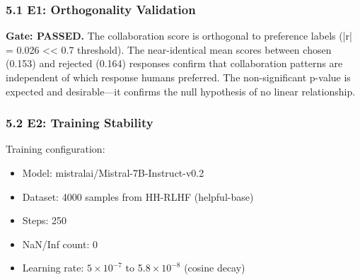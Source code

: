
\subsubsection{5.1 E1: Orthogonality Validation}

\begin{table}[htbp]
\centering
{}
\end{table}

\textbf{Gate: PASSED.} The collaboration score is orthogonal to preference labels (|r| = 0.026 << 0.7 threshold). The near-identical mean scores between chosen (0.153) and rejected (0.164) responses confirm that collaboration patterns are independent of which response humans preferred. The non-significant p-value is expected and desirable---it confirms the null hypothesis of no linear relationship.

\subsubsection{5.2 E2: Training Stability}

\begin{table}[htbp]
\centering
{}
\end{table}

Training configuration:
\begin{itemize}
\item Model: mistralai/Mistral-7B-Instruct-v0.2
\item Dataset: 4000 samples from HH-RLHF (helpful-base)
\item Steps: 250
\item NaN/Inf count: 0
\item Learning rate: $5\times 10^{-7}$ to 5.$8\times 10^{-8}$ (cosine decay)
\end{itemize}

